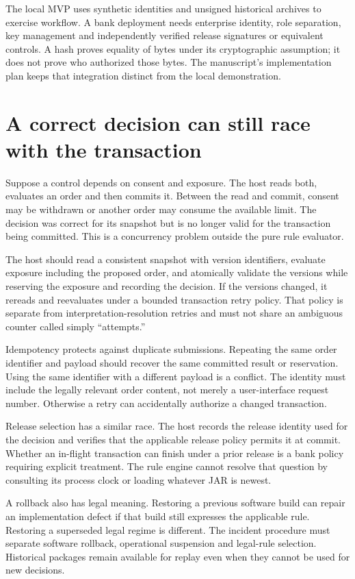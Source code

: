 \documentclass[12pt,a4paper,oneside,openany]{book}
\begin{document}
The local MVP uses synthetic identities and unsigned historical archives to
exercise workflow. A bank deployment needs enterprise identity, role separation,
key management and independently verified release signatures or equivalent
controls. A hash proves equality of bytes under its cryptographic assumption;
it does not prove who authorized those bytes. The manuscript's implementation
plan keeps that integration distinct from the local demonstration.

\section{A correct decision can still race with the transaction}

Suppose a control depends on consent and exposure. The host reads both, evaluates
an order and then commits it. Between the read and commit, consent may be
withdrawn or another order may consume the available limit. The decision was
correct for its snapshot but is no longer valid for the transaction being
committed. This is a concurrency problem outside the pure rule evaluator.

The host should read a consistent snapshot with version identifiers, evaluate
exposure including the proposed order, and atomically validate the versions while
reserving the exposure and recording the decision. If the versions changed, it
rereads and reevaluates under a bounded transaction retry policy. That policy is
separate from interpretation-resolution retries and must not share an ambiguous
counter called simply ``attempts.''

Idempotency protects against duplicate submissions. Repeating the same order
identifier and payload should recover the same committed result or reservation.
Using the same identifier with a different payload is a conflict. The identity
must include the legally relevant order content, not merely a user-interface
request number. Otherwise a retry can accidentally authorize a changed transaction.

Release selection has a similar race. The host records the release identity used
for the decision and verifies that the applicable release policy permits it at
commit. Whether an in-flight transaction can finish under a prior release is a
bank policy requiring explicit treatment. The rule engine cannot resolve that
question by consulting its process clock or loading whatever JAR is newest.

A rollback also has legal meaning. Restoring a previous software build can repair
an implementation defect if that build still expresses the applicable rule.
Restoring a superseded legal regime is different. The incident procedure must
separate software rollback, operational suspension and legal-rule selection.
Historical packages remain available for replay even when they cannot be used for
new decisions.
\end{document}
